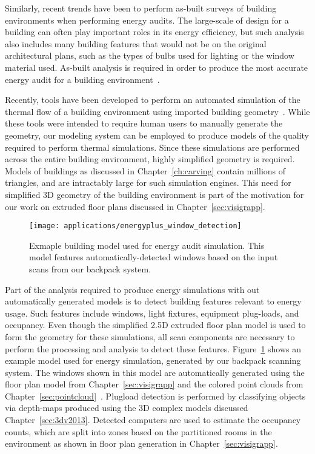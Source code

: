 \documentclass[12pt,onecolumn,oneside]{book}
\begin{document}
Similarly, recent trends have been to perform as-built surveys of building environments when performing energy audits.  The large-scale of design for a building can often play important roles in its energy efficiency, but such analysis also includes many building features that would not be on the original architectural plans, such as the types of bulbs used for lighting or the window material used.  As-built analysis is required in order to produce the most accurate energy audit for a building environment~\cite{EBConsulting}.

Recently, tools have been developed to perform an automated simulation of the thermal flow of a building environment using imported building geometry~\cite{EnergyPlus}.  While these tools were intended to require human users to manually generate the geometry, our modeling system can be employed to produce models of the quality required to perform thermal simulations.  Since these simulations are performed across the entire building environment, highly simplified geometry is required.  Models of buildings as discussed in Chapter~\ref{ch:carving} contain millions of triangles, and are intractably large for such simulation engines.  This need for simplified 3D geometry of the building environment is part of the motivation for our work on extruded floor plans discussed in Chapter~\ref{sec:visigrapp}.

\begin{figure}[t]

	\centerline{\texttt{[image: applications/energyplus\_window\_detection]}}
	
	\caption[Example building energy model with automatically-detected windows.]{Exmaple building model used for energy audit simulation.  This model features automatically-detected windows based on the input scans from our backpack system.}
	\label{fig:windows}
\end{figure}

Part of the analysis required to produce energy simulations with out automatically generated models is to detect building features relevant to energy usage.  Such features include windows, light fixtures, equipment plug-loads, and occupancy.  Even though the simplified 2.5D extruded floor plan model is used to form the geometry for these simulations, all scan components are necessary to perform the processing and analysis to detect these features.  Figure~\ref{fig:windows} shows an example model used for energy simulation, generated by our backpack scanning system.  The windows shown in this model are automatically generated using the floor plan model from Chapter~\ref{sec:visigrapp} and the colored point clouds from Chapter~\ref{sec:pointcloud}~\cite{Zhang14}.  Plugload detection is performed by classifying objects via depth-maps produced using the 3D complex models discussed Chapter~\ref{sec:3dv2013}.  Detected computers are used to estimate the occupancy counts, which are split into zones based on the partitioned rooms in the environment as shown in floor plan generation in Chapter~\ref{sec:visigrapp}.
\end{document}
